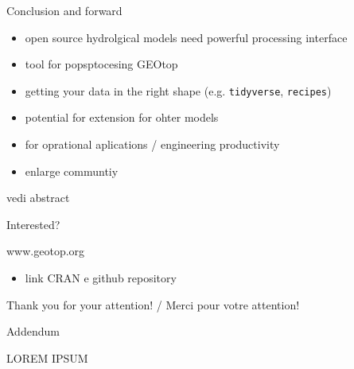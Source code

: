 \documentclass[ignorenonframetext,]{beamer}
\providecommand{\tightlist}{%
  \setlength{\itemsep}{0pt}\setlength{\parskip}{0pt}}
\begin{document}
\begin{frame}[fragile]{Conclusion and forward}

\begin{itemize}
\item
  open source hydrolgical models need powerful processing interface
\item
  tool for popsptocesing GEOtop
\item
  getting your data in the right shape (e.g. \texttt{tidyverse},
  \texttt{recipes})
\item
  potential for extension for ohter models
\item
  for oprational aplications / engineering productivity
\item
  enlarge communtiy
\end{itemize}

vedi abstract

\end{frame}

\begin{frame}{Interested?}

www.geotop.org

\begin{itemize}
\tightlist
\item
  link CRAN e github repository
\end{itemize}

Thank you for your attention! / Merci pour votre attention!

\end{frame}

\begin{frame}{Addendum}

LOREM IPSUM

\end{frame}
\end{document}
